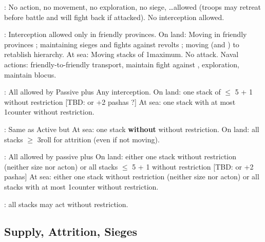 \ducats: No action, no movement, no exploration, no siege,
\ldots allowed (troops may retreat before battle and will fight back if
attacked). No interception allowed.

\ducats:
\bparag Interception allowed only in friendly provinces.
\bparag On land: Moving in friendly provinces ; maintaining sieges and fights
against revolts ; moving \LeaderG (and \LeaderC) to retablish hierarchy.
\bparag At sea: Moving stacks of 1\FLEET maximum. No attack.
\bparag Naval actions: friendly-to-friendly transport, maintain fight against
\corsaire, exploration, maintain blocus.

\ducats: All allowed by Passive plus
\bparag Any interception.
\bparag On land: one stack of $\leq$ 5 \LD + 1 \Pasha without restriction
[TBD: or +2 pashas ?]
\bparag At sea: one stack with at most 1\FLEET counter without restriction.

\ducats: Same as Active but
\bparag At sea: one stack \textbf{without} \FLEET without restriction.
\bparag On land: all stacks $\geq$ 3\LD roll for attrition (even if not moving).

\ducats: All allowed by passive plus
\bparag On land: either one stack without restriction (neither size nor acton)
or all stacks $\leq$ 5 \LD + 1 \Pasha without restriction  [TBD: or +2 pashas]
\bparag At sea: either one stack without restriction (neither size nor acton)
or all stacks with at most 1\FLEET counter without restriction.

\ducats: all stacks may act without restriction.


\subsection{Supply, Attrition, Sieges}
